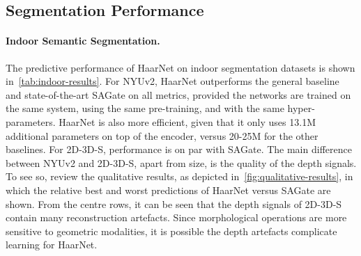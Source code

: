 \documentclass{article}
\newcommand{\myparagraph}[1]{\paragraph{\textbf{\textup{#1.}}}}
\begin{document}
\subsection{Segmentation Performance} \label{sec:experiments:indoor}
\begin{table}[t]
    \centering
    \caption{\textbf{Outdoor Segmentation Results.}
    Unlike results from indoor datasets, HaarNet significantly outperforms the baselines.
    It could be this is due to the high amount of structure present in the scenes, which allows absolute operators like morphological ones to make more rigid predictions.
    }
    \label{tab:outdoor-results}
\end{table}
\myparagraph{Indoor Semantic Segmentation}
The predictive performance of HaarNet on indoor segmentation datasets is shown in~\autoref{tab:indoor-results}.
For NYUv2, HaarNet outperforms the general baseline and state-of-the-art SAGate on all metrics, provided the networks are trained on the same system, using the same pre-training, and with the same hyper-parameters.
HaarNet is also more efficient, given that it only uses 13.1M additional parameters on top of the encoder, versus 20-25M for the other baselines.
For 2D-3D-S, performance is on par with SAGate.
The main difference between NYUv2 and 2D-3D-S, apart from size, is the quality of the depth signals.
To see so, review the qualitative results, as depicted in~\autoref{fig:qualitative-results}, in which the relative best and worst predictions of HaarNet versus SAGate are shown.
From the centre rows, it can be seen that the depth signals of 2D-3D-S contain many reconstruction artefacts. 
Since morphological operations are more sensitive to geometric modalities, it is possible the depth artefacts complicate learning for HaarNet.
\end{document}
